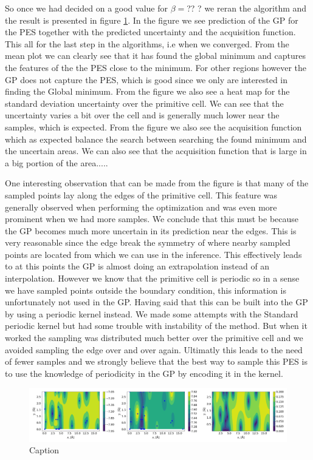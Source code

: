 \documentclass[11pt,a4paper]{article}
\begin{document}
So once we had decided on a good value for $\beta = $??
? we reran the algorithm and the result is presented in figure \ref{fig:task3_pred}. In the figure we see prediction of the GP for the PES together with the predicted uncertainty and the acquisition function. This all for the last step in the algorithms, i.e when we converged. From the mean plot we can clearly see that it has found the global minimum and captures the features of the the PES close to the minimum. For other regions however the GP does not capture the PES, which is good since we only are interested in finding the Global minimum. From the figure we also see a heat map for the standard deviation uncertainty over the primitive cell. We can see that the uncertainty varies a bit over the cell and is generally much lower near the samples, which is expected. From the figure we also see the acquisition function which as expected balance the search between searching the found minimum and the uncertain areas. We can also see that the acquisition function that is large in a big portion of the area..... 


One interesting observation that can be made from the figure is that many of the sampled points lay along the edges of the primitive cell. This feature was generally observed when performing the optimization and was even more prominent when we had more samples. We conclude that this must be because the GP becomes much more uncertain in its prediction near the edges. This is very reasonable since the edge break the symmetry of where nearby sampled points are located from which we can use in the inference. This effectively leads to at this points the GP is almost doing an extrapolation instead of an interpolation. However we know that the primitive cell is periodic so in a sense we have sampled points outside the boundary condition, this information is unfortunately not used in the GP. Having said that this can be built into the GP by using a periodic kernel instead. We made some attempts with the Standard periodic kernel but had some trouble with instability of the method. But when it worked the sampling was distributed much better over the primitive cell and we avoided sampling the edge over and over again. Ultimatly this leads to the need of fewer samples and we strongly believe that the best way to sample this PES is to use the knowledge of periodicity in the GP by encoding it in the kernel. 


\begin{figure}[H]
    \centering
    \includegraphics[width = 1\textwidth]{figures/task3_pred.png}
    \caption{Caption}
    \label{fig:task3_pred}
\end{figure}
\end{document}
